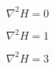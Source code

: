 \documentclass{article}
\begin{document}



\begin{equation*}
\nabla^2 H = 0
\end{equation*}


\begin{equation*}
\nabla^2 H = 1
\end{equation*}

\begin{equation*}
\nabla^2 H = 3
\end{equation*}
\end{document}
